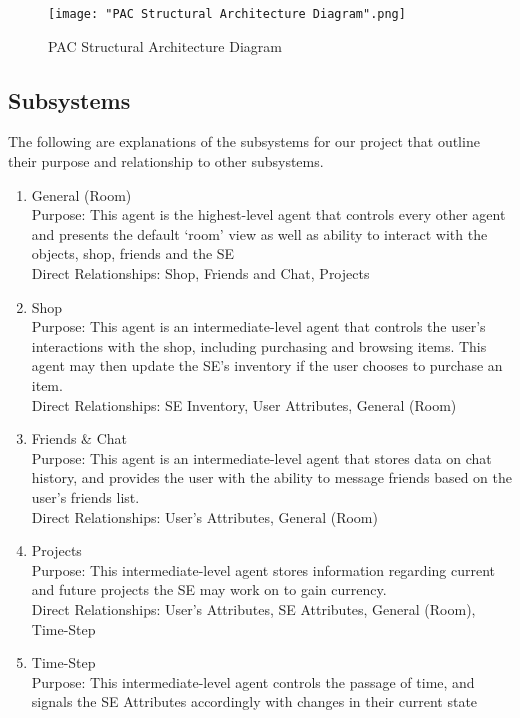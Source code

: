 \documentclass[]{article}
\begin{document}
\begin{figure}[H]
    \centering
    \texttt{[image: "PAC Structural Architecture Diagram".png]}
    \caption{PAC Structural Architecture Diagram}
\end{figure}

\subsection{Subsystems}
\label{sub:subsystems}
The following are explanations of the subsystems for our project that outline 
their purpose and relationship to other subsystems.
\begin{enumerate}
    \item General (Room)\\
    Purpose: This agent is the highest-level agent that controls every other 
    agent and presents the default ‘room’ view as well as ability to interact 
    with the objects, shop, friends and the SE\\
    Direct Relationships: Shop, Friends and Chat, Projects    
    \item Shop\\
    Purpose: This agent is an intermediate-level agent that controls the user’s 
    interactions with the shop, including purchasing and browsing items. This 
    agent may then update the SE’s inventory if the user chooses to purchase an 
    item.\\
    Direct Relationships: SE Inventory, User Attributes, General (Room)
    \item Friends \& Chat\\
    Purpose: This agent is an intermediate-level agent that stores data on chat 
    history, and provides the user with the ability to message friends based on 
    the user’s friends list.\\
    Direct Relationships: User’s Attributes, General (Room)
    \item Projects\\
    Purpose: This intermediate-level agent stores information regarding current 
    and future projects the SE may work on to gain currency.\\
    Direct Relationships: User’s Attributes, SE Attributes, General (Room), 
    Time-Step
    \item Time-Step\\
    Purpose: This intermediate-level agent controls the passage of time, and 
    signals the SE Attributes accordingly with changes in their current state 

\end{enumerate}
\end{document}
